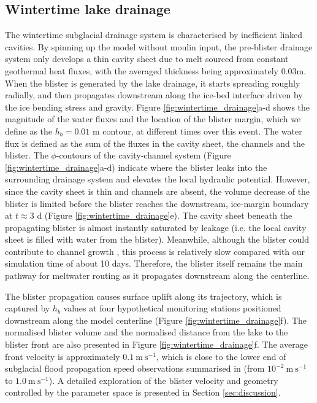 \documentclass[draft]{agujournal2019}
\newcommand{\secref}[1]{Section \ref{#1}}
\newcommand{\figref}[1]{Figure \ref{#1}}
\begin{document}
\subsection{Wintertime lake drainage}\label{sec:wintertime}
The wintertime subglacial drainage system is characterised by inefficient linked cavities. By spinning up the model without moulin input, the pre-blister drainage system only develops a thin cavity sheet due to melt sourced from constant geothermal heat fluxes, with the averaged thickness being approximately $0.03$m. When the blister is generated by the lake drainage, it starts spreading roughly radially, and then propagates downstream along the ice-bed interface driven by the ice bending stress and gravity. \figref{fig:wintertime_drainage}a-d shows the magnitude of the water fluxes and the location of the blister margin, which we define as the $h_b=0.01$ m contour, at different times over this event. The water flux is defined as the sum of the fluxes in the cavity sheet, the channels and the blister. The $\phi$-contours of the cavity-channel system (\figref{fig:wintertime_drainage}a-d) indicate where the blister leaks into the surrounding drainage system and elevates the local hydraulic potential. However, since the cavity sheet is thin and channels are absent, the volume decrease of the blister is limited before the blister reaches the downstream, ice-margin boundary at $t\approx3$ d (\figref{fig:wintertime_drainage}e). The cavity sheet beneath the propagating blister is almost instantly saturated by leakage (i.e. the local cavity sheet is filled with water from the blister). Meanwhile, although the blister could contribute to channel growth \cite{dow2015Modeling}, this process is relatively slow compared with our simulation time of about 10 days. Therefore, the blister itself remains the main pathway for meltwater routing as it propagates downstream along the centerline.

The blister propagation causes surface uplift along its trajectory, which is captured by $h_b$ values at four hypothetical monitoring stations positioned downstream along the model centerline (\figref{fig:wintertime_drainage}f). The normalised blister volume and the normalised distance from the lake to the blister front are also presented in \figref{fig:wintertime_drainage}f. The average front velocity is approximately $0.1~\text{m}~\text{s}^{-1}$, which is close to the lower end of subglacial flood propagation speed observations summarised in  (from $10^{-2}~\text{m}~\text{s}^{-1}$ to $1.0~\text{m}~\text{s}^{-1}$). A detailed exploration of the blister velocity and geometry controlled by the parameter space is presented in \secref{sec:discussion}.
\end{document}
